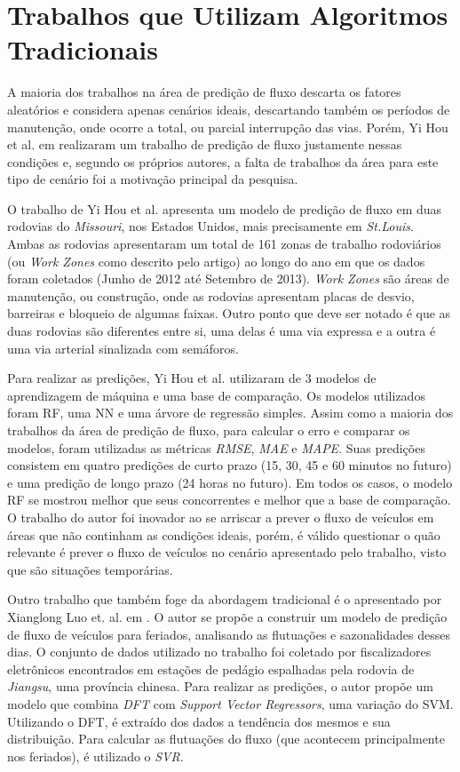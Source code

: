 \section{Trabalhos que Utilizam Algoritmos Tradicionais}

A maioria dos trabalhos na área de predição de fluxo descarta os fatores aleatórios e considera apenas cenários ideais, descartando também os períodos de manutenção, onde ocorre a total, ou parcial interrupção das vias. Porém, Yi Hou et al. em \cite{hou2014traffic} realizaram um trabalho de predição de fluxo justamente nessas condições e, segundo os próprios autores, a falta de trabalhos da área para este tipo de cenário foi a motivação principal da pesquisa. 

O trabalho de Yi Hou et al. apresenta um modelo de predição de fluxo em duas rodovias do \textit{Missouri}, nos Estados Unidos, mais precisamente em \textit{St.Louis}. Ambas as rodovias apresentaram um total de 161 zonas de trabalho rodoviários (ou \textit{Work Zones} como descrito pelo artigo) ao longo do ano em que os dados foram coletados (Junho de 2012 até Setembro de 2013). \textit{Work Zones} são áreas de manutenção, ou construção, onde as rodovias apresentam placas de desvio, barreiras e bloqueio de algumas faixas. Outro ponto que deve ser notado é que as duas rodovias são diferentes entre si, uma delas é uma via expressa e a outra é uma via arterial sinalizada com semáforos.

Para realizar as predições, Yi Hou et al. utilizaram de 3 modelos de aprendizagem de máquina e uma base de comparação. Os modelos utilizados foram \acrfull{RF}, uma \acrfull{NN} e uma árvore de regressão simples. Assim como a maioria dos trabalhos da área de predição de fluxo, para calcular o erro e comparar os modelos, foram utilizadas as métricas \textit{RMSE}, \textit{MAE} e \textit{MAPE}. Suas predições consistem em quatro predições de curto prazo (15, 30, 45 e 60 minutos no futuro) e uma predição de longo prazo (24 horas no futuro). Em todos os casos, o modelo \acrshort{RF} se mostrou melhor que seus concorrentes e melhor que a base de comparação. O trabalho do autor foi inovador ao se arriscar a prever o fluxo de veículos em áreas que não continham as condições ideais, porém, é válido questionar o quão relevante é prever o fluxo de veículos no cenário apresentado pelo trabalho, visto que são situações temporárias.


Outro trabalho que também foge da abordagem tradicional é o apresentado por Xianglong Luo et. al. em \cite{luo2019traffic}. O autor se propõe a construir um modelo de predição de fluxo de veículos para feriados, analisando as flutuações e sazonalidades desses dias. O conjunto de dados utilizado no trabalho foi coletado por fiscalizadores eletrônicos encontrados em estações de pedágio espalhadas pela rodovia de \textit{Jiangsu}, uma província chinesa. Para realizar as predições, o autor propõe um modelo que combina \textit{\acrfull{DFT}} com \textit{Support Vector Regressors}, uma variação do \acrshort{SVM}. Utilizando o \acrshort{DFT}, é extraído dos dados a tendência dos mesmos e sua distribuição. Para calcular as flutuações do fluxo (que acontecem principalmente nos feriados), é utilizado o \textit{SVR}.

